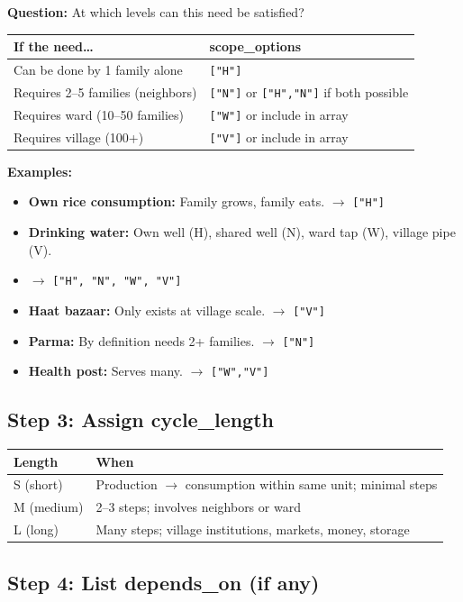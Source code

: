 \documentclass[11pt,a4paper]{article}
\begin{document}
\textbf{Question:} At which levels can this need be satisfied?

\begin{tabular}{ll}
\hline
\textbf{If the need\ldots} & \textbf{scope\_options} \\
\hline
Can be done by 1 family alone & \texttt{["H"]} \\
Requires 2--5 families (neighbors) & \texttt{["N"]} or \texttt{["H","N"]} if both possible \\
Requires ward (10--50 families) & \texttt{["W"]} or include in array \\
Requires village (100+) & \texttt{["V"]} or include in array \\
\hline
\end{tabular}

\textbf{Examples:}
\begin{itemize}
    \item \textbf{Own rice consumption:} Family grows, family eats. $\rightarrow$ \texttt{["H"]}
    \item \textbf{Drinking water:} Own well (H), shared well (N), ward tap (W), village pipe (V).
    \item[] $\rightarrow$ \texttt{["H", "N", "W", "V"]}
    \item \textbf{Haat bazaar:} Only exists at village scale. $\rightarrow$ \texttt{["V"]}
    \item \textbf{Parma:} By definition needs 2+ families. $\rightarrow$ \texttt{["N"]}
    \item \textbf{Health post:} Serves many. $\rightarrow$ \texttt{["W","V"]}
\end{itemize}

\subsection{Step 3: Assign cycle\_length}

\begin{tabular}{ll}
\hline
\textbf{Length} & \textbf{When} \\
\hline
S (short) & Production $\rightarrow$ consumption within same unit; minimal steps \\
M (medium) & 2--3 steps; involves neighbors or ward \\
L (long) & Many steps; village institutions, markets, money, storage \\
\hline
\end{tabular}

\subsection{Step 4: List depends\_on (if any)}
\end{document}
